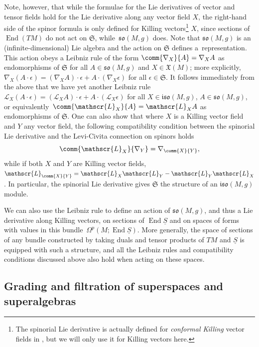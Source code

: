 \documentclass[pdftex]{sigma}
\numberwithin{equation}{section}
\newcommand{\fso}{\mathfrak{so}}
\newcommand{\fiso}{\mathfrak{iso}}
\newcommand{\fX}{\mathfrak{X}}
\newcommand{\fS}{\mathfrak{S}}
\newcommand{\eL}{\mathscr{L}}
\newcommand{\Sbundle}{\underline{S}}
\newcommand{\1}{\mathbbm{1}}
\DeclareMathOperator{\End}{End}
\begin{document}
Note, however, that while the formulae for the Lie derivatives of vector and tensor fields hold for the Lie derivative along any vector field $X$, the right-hand side of the spinor formula is only defined for Killing vectors\footnote{The spinorial Lie derivative is actually defined for \emph{conformal Killing} vector fields in \cite{Kosmann1971}, but we will only use it for Killing vectors here.}
$X$, since sections of $\End(TM)$ do not act on $\fS$, while~$\fso(M,g)$ does. Note that $\fso(M,g)$ is an (infinite-dimensional) Lie algebra and the action on $\fS$ defines a~representation. This action obeys a Leibniz rule of the form $\comm{\nabla_X}{A}=\nabla_X A$ as endomorphisms of $\fS$ for all $A\in\fso(M,g)$ and $X\in\fX(M)$; more explicitly,
$\nabla_X (A\cdot\epsilon) = (\nabla_X A)\cdot\epsilon + A\cdot(\nabla_X \epsilon)
$
for all $\epsilon\in\fS$. It follows immediately from the above that we have yet another Leibniz rule~${\eL_X (A\cdot\epsilon) = (\eL_X A)\cdot\epsilon + A\cdot(\eL_X \epsilon)
}$
for all $X\in\fiso(M,g)$, $A\in\fso(M,g)$, or equivalently~${\comm{\eL_X}{A}=\eL_X A}$ as endomorphisms of $\fS$. One can also show that where $X$ is a Killing vector field and $Y$ any vector field, the following compatibility condition between the spinorial Lie derivative and the Levi-Civita connection on spinors holds
\begin{equation}\label{eq:lie-der-compat}
	\comm{\eL_X}{\nabla_Y} = \nabla_{\comm{X}{Y}},
\end{equation}
while if both $X$ and $Y$ are Killing vector fields,
$\eL_{\comm{X}{Y}} = \eL_X\eL_Y - \eL_Y\eL_X$.
In particular, the spinorial Lie derivative gives $\fS$ the structure of an $\fiso(M,g)$ module.

We can also use the Leibniz rule to define an action of $\fso(M,g)$, and thus a Lie derivative along Killing vectors, on sections of $\End\Sbundle$ and on spaces of forms with values in this bundle~$\Omega^p(M;\End\Sbundle)$. More generally, the space of sections of any bundle constructed by taking duals and tensor products of $TM$ and $\Sbundle$ is equipped with such a structure, and all the Leibniz rules and compatibility conditions discussed above also hold when acting on these spaces.


\subsection{Grading and filtration of superspaces and superalgebras}
\label{sec:grading-filtration-superspace}
\end{document}
